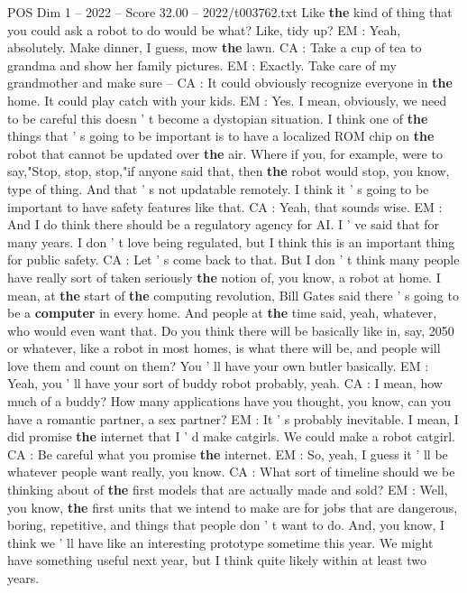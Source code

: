 \begin{textsample}{POS Dim 1 – 2022 – Score 32.00 – 2022/t003762.txt}
Like \textbf{the} kind of thing that you could ask a robot to do would be what?
Like, tidy up?
EM : Yeah, absolutely.
Make dinner, I guess, mow \textbf{the} lawn.
CA : Take a cup of tea to grandma and show her family pictures.
EM : Exactly.
Take care of my grandmother and make sure -- CA : It could obviously recognize everyone in \textbf{the} home.
It could play catch with your kids.
EM : Yes.
I mean, obviously, we need to be careful this doesn ' t become a dystopian situation.
I think one of \textbf{the} things that ' s going to be important is to have a localized ROM chip on \textbf{the} robot that cannot be updated over \textbf{the} air.
Where if you, for example, were to say,"Stop, stop, stop,"if anyone said that, then \textbf{the} robot would stop, you know, type of thing.
And that ' s not updatable remotely.
I think it ' s going to be important to have safety features like that.
CA : Yeah, that sounds wise.
EM : And I do think there should be a regulatory agency for AI.
I ' ve said that for many years.
I don ' t love being regulated, but I think this is an important thing for public safety.
CA : Let ' s come back to that.
But I don ' t think many people have really sort of taken seriously \textbf{the} notion of, you know, a robot at home.
I mean, at \textbf{the} start of \textbf{the} computing revolution, Bill Gates said there ' s going to be a \textbf{computer} in every home.
And people at \textbf{the} time said, yeah, whatever, who would even want that.
Do you think there will be basically like in, say, 2050 or whatever, like a robot in most homes, is what there will be, and people will love them and count on them?
You ' ll have your own butler basically.
EM : Yeah, you ' ll have your sort of buddy robot probably, yeah.
CA : I mean, how much of a buddy?
How many applications have you thought, you know, can you have a romantic partner, a sex partner?
EM : It ' s probably inevitable.
I mean, I did promise \textbf{the} internet that I ' d make catgirls.
We could make a robot catgirl.
CA : Be careful what you promise \textbf{the} internet.
EM : So, yeah, I guess it ' ll be whatever people want really, you know.
CA : What sort of timeline should we be thinking about of \textbf{the} first models that are actually made and sold?
EM : Well, you know, \textbf{the} first units that we intend to make are for jobs that are dangerous, boring, repetitive, and things that people don ' t want to do.
And, you know, I think we ' ll have like an interesting prototype sometime this year.
We might have something useful next year, but I think quite likely within at least two years.

\end{textsample}
